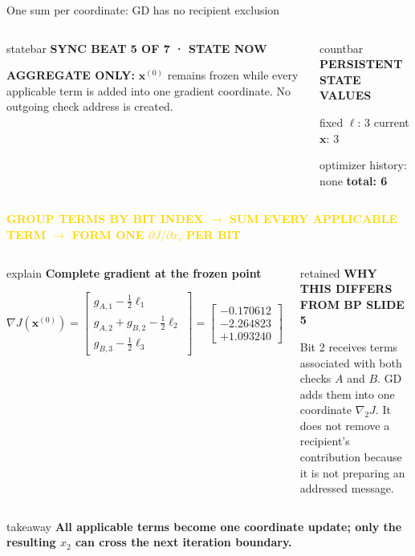 \documentclass[aspectratio=169,9pt,t]{beamer}
\newcommand{\countstrip}[2]{%
  \begin{columns}[T,onlytextwidth]
    \column{.705\textwidth}
      \begin{beamercolorbox}[rounded=true,sep=.62ex]{statebar}
        \fontsize{6.4}{7.0}\selectfont\textcolor{Muted}{\bfseries SYNC BEAT #1 OF 7 \;·\; STATE NOW}\par
        \vspace{.15ex}\scriptsize #2
      \end{beamercolorbox}
    \column{.275\textwidth}
      \begin{beamercolorbox}[rounded=true,sep=.52ex]{countbar}
        \fontsize{6.4}{7.0}\selectfont\textcolor{GD}{\bfseries PERSISTENT STATE VALUES}\par
        \fontsize{6.1}{6.8}\selectfont
        fixed $\boldsymbol\ell$: 3 \quad current $\mathbf{x}$: 3\par
        optimizer history: none \quad \textbf{total: 6}
      \end{beamercolorbox}
  \end{columns}\vspace{.6mm}}
\newcommand{\phase}[1]{%
  \centering\colorbox{GoldSoft}{\strut\scriptsize\bfseries\textcolor{Gold}{#1}}\par\vspace{.6mm}}
\newcommand{\callout}[1]{%
  \begin{beamercolorbox}[rounded=true,sep=.65ex]{explain}
    \scriptsize #1
  \end{beamercolorbox}}
\newcommand{\takeaway}[1]{%
  \vspace{.3mm}\begin{beamercolorbox}[wd=\textwidth,rounded=true,sep=.6ex]{takeaway}
    \centering\scriptsize\bfseries #1
  \end{beamercolorbox}}
\begin{document}
\begin{frame}{One sum per coordinate: GD has no recipient exclusion}
  \countstrip{5}{\textbf{AGGREGATE ONLY: }$\mathbf{x}^{(0)}$ remains frozen while every applicable term is added into one gradient coordinate. No outgoing check address is created.}

  \phase{GROUP TERMS BY BIT INDEX \quad $\longrightarrow$ \quad SUM EVERY APPLICABLE TERM \quad $\longrightarrow$ \quad FORM ONE $\partial J/\partial x_i$ PER BIT}

  \begin{columns}[T,onlytextwidth]
      \centering
      \callout{\centering\textbf{Complete gradient at the frozen point}\par
        \[
          \nabla J(\mathbf{x}^{(0)})=
          \begin{bmatrix}
            g_{A,1}-\tfrac12\ell_1\\
            g_{A,2}+g_{B,2}-\tfrac12\ell_2\\
            g_{B,3}-\tfrac12\ell_3
          \end{bmatrix}
          =\begin{bmatrix}
            -0.170612\\[-.3mm]
            -2.264823\\[-.3mm]
            +1.093240
          \end{bmatrix}
        \]}
      \vspace{.7mm}
      \begin{beamercolorbox}[rounded=true,sep=.75ex]{retained}
        \scriptsize\textcolor{GD}{\bfseries WHY THIS DIFFERS FROM BP SLIDE 5}\par\vspace{.5mm}
        Bit 2 receives terms associated with both checks $A$ and $B$. GD adds them into one coordinate $\nabla_2J$. It does not remove a recipient's contribution because it is not preparing an addressed message.
      \end{beamercolorbox}
  \end{columns}

  \takeaway{All applicable terms become one coordinate update; only the resulting $x_2$ can cross the next iteration boundary.}
\end{frame}
\end{document}
